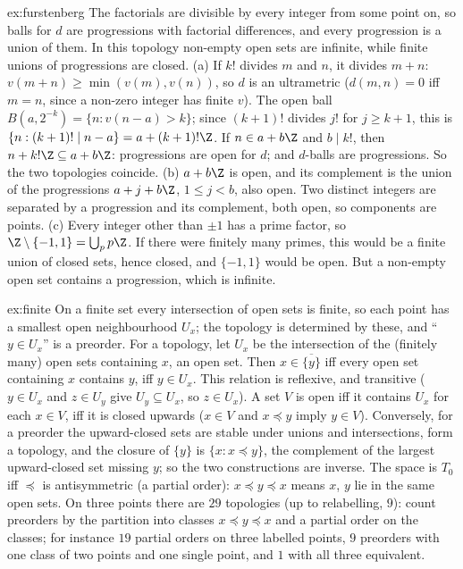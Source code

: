 \begin{solution}{ex:furstenberg}
\idea The factorials are divisible by every integer from some point on, so balls for $d$ are progressions with factorial differences, and
every progression is a union of them. In this topology non-empty open sets are infinite, while finite unions of progressions are closed.
\writeup (a) If $k!$ divides $m$ and $n$, it divides $m+n$: $v(m+n)\ge\min(v(m),v(n))$, so $d$ is an ultrametric ($d(m,n)=0$ iff $m=n$, since a non-zero integer has finite
$v$). The open ball $B(a,2^{-k})=\{n:v(n-a)>k\}$; since $(k+1)!$ divides $j!$ for $j\ge k+1$, this is $\{n:(k+1)!\mid n-a\}=a+(k+1)!\Z$. If $n\in a+b\Z$ and $b\mid k!$, then
$n+k!\Z\subseteq a+b\Z$: progressions are open for $d$; and $d$-balls are progressions. So the two topologies coincide. (b) $a+b\Z$ is open, and its
complement is the union of the progressions $a+j+b\Z$, $1\le j<b$, also open. Two distinct integers are separated by a progression and its
complement, both open, so components are points. (c) Every integer other than $\pm1$ has a prime factor, so $\Z\setminus\{-1,1\}=\bigcup_pp\Z$. If there
were finitely many primes, this would be a finite union of closed sets, hence closed, and $\{-1,1\}$ would be open. But a non-empty open set
contains a progression, which is infinite.
\end{solution}

\begin{solution}{ex:finite}
\idea On a finite set every intersection of open sets is finite, so each point has a smallest open neighbourhood $U_x$; the topology is determined
by these, and ``$y\in U_x$'' is a preorder.
\writeup For a topology, let $U_x$ be the intersection of the (finitely many) open sets containing $x$, an open set. Then $x\in\overline{\{y\}}$ iff every open set
containing $x$ contains $y$, iff $y\in U_x$. This relation is reflexive, and transitive ($y\in U_x$ and $z\in U_y$ give $U_y\subseteq U_x$, so $z\in U_x$). A set $V$ is open iff
it contains $U_x$ for each $x\in V$, iff it is closed upwards ($x\in V$ and $x\preceq y$ imply $y\in V$). Conversely, for a preorder the upward-closed sets are stable
under unions and intersections, form a topology, and the closure of $\{y\}$ is $\{x:x\preceq y\}$, the complement of the largest upward-closed set
missing $y$; so the two constructions are inverse. The space is $T_0$ iff $\preceq$ is antisymmetric (a partial order): $x\preceq y\preceq x$ means $x$, $y$ lie in the
same open sets. On three points there are $29$ topologies (up to relabelling, $9$): count preorders by the partition into classes
$x\preceq y\preceq x$ and a partial order on the classes; for instance $19$ partial orders on three labelled points, $9$ preorders with one class of two
points and one single point, and $1$ with all three equivalent.
\end{solution}

